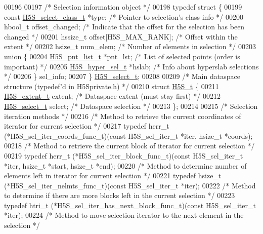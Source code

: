 \begin{DoxyCode}
00196 
00197 \textcolor{comment}{/* Selection information object */}
00198 \textcolor{keyword}{typedef} \textcolor{keyword}{struct }\{
00199     \textcolor{keyword}{const} \hyperlink{struct_h5_s__select__class__t}{H5S\_select\_class\_t} *type;     \textcolor{comment}{/* Pointer to selection's class info */}
00200     hbool\_t offset\_changed;             \textcolor{comment}{/* Indicate that the offset for the selection has been changed */}
00201     hssize\_t offset[H5S\_MAX\_RANK];      \textcolor{comment}{/* Offset within the extent */}
00202     hsize\_t num\_elem;   \textcolor{comment}{/* Number of elements in selection */}
00203     \textcolor{keyword}{union }\{
00204         \hyperlink{struct_h5_s__pnt__list__t}{H5S\_pnt\_list\_t} *pnt\_lst; \textcolor{comment}{/* List of selected points (order is important) */}
00205         \hyperlink{struct_h5_s__hyper__sel__t}{H5S\_hyper\_sel\_t} *hslab;  \textcolor{comment}{/* Info about hyperslab selections */}
00206     \} sel\_info;
00207 \} \hyperlink{struct_h5_s__select__t}{H5S\_select\_t};
00208 
00209 \textcolor{comment}{/* Main dataspace structure (typedef'd in H5Sprivate.h) */}
00210 \textcolor{keyword}{struct }\hyperlink{struct_h5_s__t}{H5S\_t} \{
00211     \hyperlink{struct_h5_s__extent__t}{H5S\_extent\_t} extent;                \textcolor{comment}{/* Dataspace extent (must stay first) */}
00212     \hyperlink{struct_h5_s__select__t}{H5S\_select\_t} select;        \textcolor{comment}{/* Dataspace selection */}
00213 \};
00214 
00215 \textcolor{comment}{/* Selection iteration methods */}
00216 \textcolor{comment}{/* Method to retrieve the current coordinates of iterator for current selection */}
00217 \textcolor{keyword}{typedef} herr\_t (*H5S\_sel\_iter\_coords\_func\_t)(\textcolor{keyword}{const} H5S\_sel\_iter\_t *iter, hsize\_t *coords);
00218 \textcolor{comment}{/* Method to retrieve the current block of iterator for current selection */}
00219 \textcolor{keyword}{typedef} herr\_t (*H5S\_sel\_iter\_block\_func\_t)(\textcolor{keyword}{const} H5S\_sel\_iter\_t *iter, hsize\_t *start, hsize\_t *end);
00220 \textcolor{comment}{/* Method to determine number of elements left in iterator for current selection */}
00221 \textcolor{keyword}{typedef} hsize\_t (*H5S\_sel\_iter\_nelmts\_func\_t)(\textcolor{keyword}{const} H5S\_sel\_iter\_t *iter);
00222 \textcolor{comment}{/* Method to determine if there are more blocks left in the current selection */}
00223 \textcolor{keyword}{typedef} htri\_t (*H5S\_sel\_iter\_has\_next\_block\_func\_t)(\textcolor{keyword}{const} H5S\_sel\_iter\_t *iter);
00224 \textcolor{comment}{/* Method to move selection iterator to the next element in the selection */}

\end{DoxyCode}
